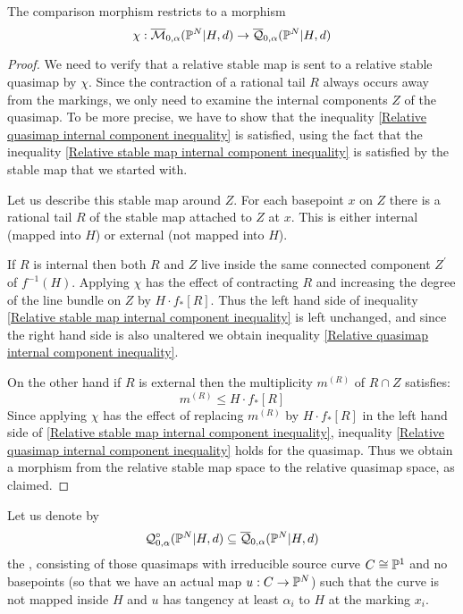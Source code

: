 \begin{lem}\label{lem:comparison}
The comparison morphism restricts to a morphism 
\begin{equation*} \chi: \overline{\mathcal M}_{0,\alpha}(\mathbb P^N|H,d)\rightarrow \overline{\mathcal Q}_{0,\alpha}(\mathbb P^N|H,d) \end{equation*}
\end{lem}
\begin{proof}
We need to verify that a relative stable map is sent to a relative stable quasimap by $\chi$. Since the contraction of a rational tail $R$ always occurs away from the markings, we only need to examine the internal components $Z$ of the quasimap. To be more precise, we have to show that the inequality \eqref{Relative quasimap internal component inequality} is satisfied, using the fact that the inequality \eqref{Relative stable map internal component inequality} is satisfied by the stable map that we started with.

Let us describe this stable map around $Z$. For each basepoint $x$ on $Z$ there is a rational tail $R$ of the stable map attached to $Z$ at $x$. This is either internal (mapped into $H$) or external (not mapped into $H$).

If $R$ is internal then both $R$ and $Z$ live inside the same connected component $Z^\prime$ of $f^{-1}(H)$. Applying $\chi$ has the effect of contracting $R$ and increasing the degree of the line bundle on $Z$ by $H \cdot f_* [R]$. Thus the left hand side of inequality \eqref{Relative stable map internal component inequality} is left unchanged, and since the right hand side is also unaltered we obtain inequality \eqref{Relative quasimap internal component inequality}.

On the other hand if $R$ is external then the multiplicity $m^{(R)}$ of $R \cap Z$ satisfies:
\begin{equation*} m^{(R)} \leq H \cdot f_* [R] \end{equation*}
Since applying $\chi$ has the effect of replacing $m^{(R)}$ by $H \cdot f_* [R]$ in the left hand side of \eqref{Relative stable map internal component inequality}, inequality \eqref{Relative quasimap internal component inequality} holds for the quasimap. Thus we obtain a morphism from the relative stable map space to the relative quasimap space, as claimed.
\end{proof}
Let us denote by
\begin{equation*} \mathcal Q^{\circ}_{0,\alpha}(\mathbb P^N|H,d) \subseteq \overline{\mathcal Q}_{0,\alpha}(\mathbb P^N|H,d) \end{equation*}
the , consisting of those quasimaps with irreducible source curve $C \cong \mathbb P^1$ and no basepoints (so that we have an actual map $u : C \rightarrow \mathbb P^N$) such that the curve is not mapped inside $H$ and $u$ has tangency at least $\alpha_i$ to $H$ at the marking $x_i$.


